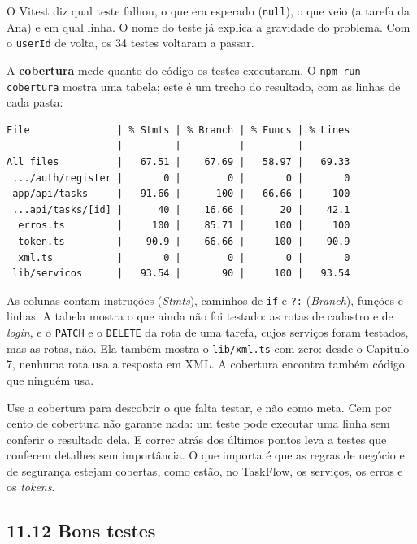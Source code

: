 O Vitest diz qual teste falhou, o que era esperado (\texttt{null}), o que veio (a tarefa da Ana) e em qual linha. O nome do teste já explica a gravidade do problema. Com o \texttt{userId} de volta, os 34 testes voltaram a passar.

A \textbf{cobertura} mede quanto do código os testes executaram. O \texttt{npm run cobertura} mostra uma tabela; este é um trecho do resultado, com as linhas de cada pasta:

\begin{codigo}
\begin{Verbatim}[breaklines=true, breaksymbolleft={}, fontsize=\footnotesize]
File               | % Stmts | % Branch | % Funcs | % Lines
-------------------|---------|----------|---------|--------
All files          |   67.51 |    67.69 |   58.97 |   69.33
 .../auth/register |       0 |        0 |       0 |       0
 app/api/tasks     |   91.66 |      100 |   66.66 |     100
 ...api/tasks/[id] |      40 |    16.66 |      20 |    42.1
  erros.ts         |     100 |    85.71 |     100 |     100
  token.ts         |    90.9 |    66.66 |     100 |    90.9
  xml.ts           |       0 |        0 |       0 |       0
 lib/servicos      |   93.54 |       90 |     100 |   93.54
\end{Verbatim}
\end{codigo}

As colunas contam instruções (\textit{Stmts}), caminhos de \texttt{if} e \texttt{?:} (\textit{Branch}), funções e linhas. A tabela mostra o que ainda não foi testado: as rotas de cadastro e de \textit{login}, e o \texttt{PATCH} e o \texttt{DELETE} da rota de uma tarefa, cujos serviços foram testados, mas as rotas, não. Ela também mostra o \texttt{lib/xml.ts} com zero: desde o Capítulo 7, nenhuma rota usa a resposta em XML. A cobertura encontra também código que ninguém usa.

Use a cobertura para descobrir o que falta testar, e não como meta. Cem por cento de cobertura não garante nada: um teste pode executar uma linha sem conferir o resultado dela. E correr atrás dos últimos pontos leva a testes que conferem detalhes sem importância. O que importa é que as regras de negócio e de segurança estejam cobertas, como estão, no TaskFlow, os serviços, os erros e os \textit{tokens}.

\subsection{11.12 Bons testes}

